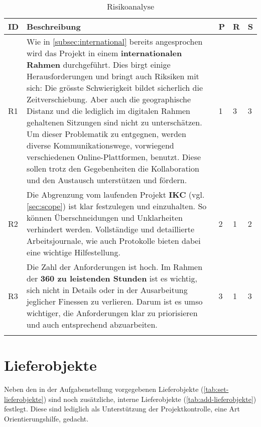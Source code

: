 \begin{longtable}{|p{0.5cm} | p{7cm} | p{1cm}|  p{1cm}|  p{1cm}|}
  \hline
    ID & Beschreibung &  P & R & S \\\hline
    R1 & Wie in \autoref{subsec:international} bereits angesprochen wird das Projekt in einem \textbf{internationalen Rahmen} durchgeführt. Dies birgt einige Herausforderungen und bringt auch Riksiken mit sich: Die grösste Schwierigkeit bildet sicherlich die Zeitverschiebung. Aber auch die geographische Distanz und die lediglich im digitalen Rahmen gehaltenen Sitzungen sind nicht zu unterschätzen.\newline
    Um dieser Problematik zu entgegnen, werden diverse Kommunikationswege, vorwiegend verschiedenen On\-line-Platt\-for\-men, benutzt. Diese sollen trotz den Gegebenheiten die Kollaboration und den Austausch unterstützen und fördern. & 1 & 3 & 3\\\hline
    R2 & Die Abgrenzung vom laufenden Projekt \textbf{\acrshort{IKC}} (vgl. \autoref{sec:scope}) ist klar festzulegen und einzuhalten. So können Überschneidungen und Unklarheiten verhindert werden.\newline
    Vollständige und detaillierte Arbeitsjournale, wie auch Protokolle bieten dabei eine wichtige Hilfestellung.  & 2 & 1 & 2\\\hline
    R3 & Die Zahl der Anforderungen ist hoch. Im Rahmen der \textbf{360 zu leistenden Stunden} ist es wichtig, sich nicht in Details oder in der Ausarbeitung jeglicher Finessen zu verlieren.\newline
    Darum ist es umso wichtiger, die Anforderungen klar zu priorisieren und auch entsprechend abzuarbeiten.  & 3 & 1 & 3\\\hline
    \caption{Risikoanalyse}
  \label{tab:risikoanalyse}
\end{longtable}

\section{Lieferobjekte}\label{lieferobjekte}

Neben den in der Aufgabenstellung vorgegebenen Lieferobjekte (\autoref{tab:set-lieferobjekte}) sind noch zusätzliche, interne Lieferobjekte (\autoref{tab:add-lieferobjekte}) festlegt. Diese sind lediglich als Unterstützung der Projektkontrolle, eine Art Orientierungshilfe, gedacht.

